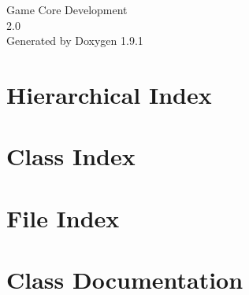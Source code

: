 \let\mypdfximage\pdfximage\def\pdfximage{\immediate\mypdfximage}\documentclass[twoside]{book}
\newcommand{\+}{\discretionary{\mbox{\scriptsize$\hookleftarrow$}}{}{}}
\newcommand{\clearemptydoublepage}{%
  \newpage{\pagestyle{empty}\cleardoublepage}%
}
\begin{document}
\raggedbottom

\hypersetup{pageanchor=false,
             bookmarksnumbered=true,
             pdfencoding=unicode
            }
\begin{titlepage}
\vspace*{7cm}
\begin{center}%
{\Large Game Core Development \\[1ex]\large 2.\+0 }\\
\vspace*{1cm}
{\large Generated by Doxygen 1.9.1}\\
\end{center}
\end{titlepage}
\clearemptydoublepage
{}
\tableofcontents
\clearemptydoublepage
{}
\hypersetup{pageanchor=true}

\chapter{Hierarchical Index}

\chapter{Class Index}

\chapter{File Index}

\chapter{Class Documentation}




















\end{document}
